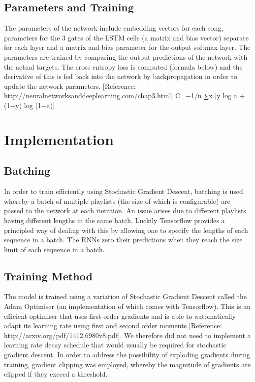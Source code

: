 \documentclass{article} %
\begin{document}
\subsection{Parameters and Training}
The parameters of the network include embedding vectors for each song, parameters for the 3 gates of the LSTM cells (a matrix and bias vector) separate for each layer and a matrix and bias parameter for the output softmax layer. The parameters are trained by comparing the output predictions of the network with the actual targets. The cross entropy loss is computed (formula below) and the derivative of this is fed back into the network by backpropagation in order to update the network parameters. [Reference:  http://neuralnetworksanddeeplearning.com/chap3.html]
C=−1/n ∑x [y log a + (1−y) log (1−a)]  

\section{Implementation}

\subsection{Batching}
In order to train efficiently using Stochastic Gradient Descent, batching is used whereby a batch of multiple playlists (the size of which is configurable) are passed to the network at each iteration. An issue arises due to different playlists having different lengths in the same batch. Luckily Tensorflow provides a principled way of dealing with this by allowing one to specify the lengths of each sequence in a batch. The RNNs zero their predictions when they reach the size limit of each sequence in a batch. 

\subsection{Training Method}
The model is trained using a variation of Stochastic Gradient Descent called the Adam Optimiser (an implementation of which comes with Tensorflow). This is an efficient optimiser that uses first-order gradients and is able to automatically adapt its learning rate using first and second order moments [Reference: http://arxiv.org/pdf/1412.6980v8.pdf]. We therefore did not need to implement a learning rate decay schedule that would usually be required for stochastic gradient descent. In order to address the possibility of exploding gradients during training, gradient clipping was employed, whereby the magnitude of gradients are clipped if they exceed a threshold. 
\end{document}
